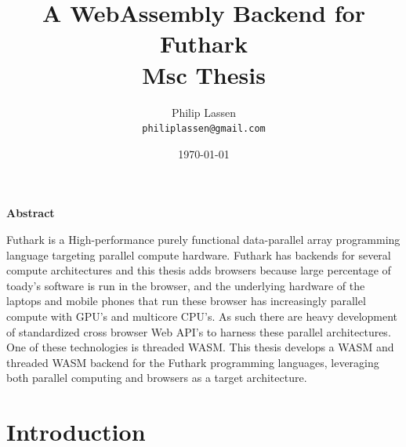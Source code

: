 \documentclass[11pt]{book}
\title{
  \vspace{3cm}
  \Huge{A WebAssembly Backend for Futhark} \\
  \Large{Msc Thesis}
}
\author{
  \Large{Philip Lassen}
  \\ \texttt{philiplassen@gmail.com} \\
}
\date{
    \today
}
\def \ColourPDF {include/natbio-farve}
\def \TitlePDF   {include/nat-en}  %
\begin{document}


\clearpage\maketitle
\thispagestyle{empty}
\setcounter{page}{0}
\newpage
{}
\begin{center}
    \textbf{Abstract}
\end{center}

Futhark is a High-performance purely functional data-parallel array programming language targeting parallel compute hardware. Futhark has backends for several  compute architectures  and this thesis adds browsers because large percentage of toady's software is run in the browser, and the underlying hardware of the laptops and mobile phones that run these browser has increasingly parallel compute with GPU's and multicore CPU's. As such there are heavy development of standardized cross browser Web API's to harness these parallel architectures. One of these technologies is threaded WASM. This thesis develops a WASM and threaded WASM backend for the Futhark programming languages, leveraging both parallel computing and browsers as a target architecture.  


\tableofcontents



\chapter{Introduction}
\setcounter{page}{1}
\end{document}
